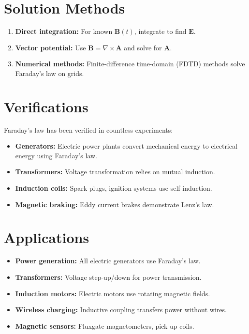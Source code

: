 \section*{Solution Methods}

\begin{enumerate}
\item \textbf{Direct integration:} For known $\mathbf{B}(t)$, integrate to find $\mathbf{E}$.
\item \textbf{Vector potential:} Use $\mathbf{B} = \nabla \times \mathbf{A}$ and solve for $\mathbf{A}$.
\item \textbf{Numerical methods:} Finite-difference time-domain (FDTD) methods solve Faraday's law on grids.
\end{enumerate}

\section*{Verifications}

Faraday's law has been verified in countless experiments:

\begin{itemize}
\item \textbf{Generators:} Electric power plants convert mechanical energy to electrical energy using Faraday's law.
\item \textbf{Transformers:} Voltage transformation relies on mutual induction.
\item \textbf{Induction coils:} Spark plugs, ignition systems use self-induction.
\item \textbf{Magnetic braking:} Eddy current brakes demonstrate Lenz's law.
\end{itemize}

\section*{Applications}

\begin{itemize}
\item \textbf{Power generation:} All electric generators use Faraday's law.
\item \textbf{Transformers:} Voltage step-up/down for power transmission.
\item \textbf{Induction motors:} Electric motors use rotating magnetic fields.
\item \textbf{Wireless charging:} Inductive coupling transfers power without wires.
\item \textbf{Magnetic sensors:} Fluxgate magnetometers, pick-up coils.
\end{itemize}

